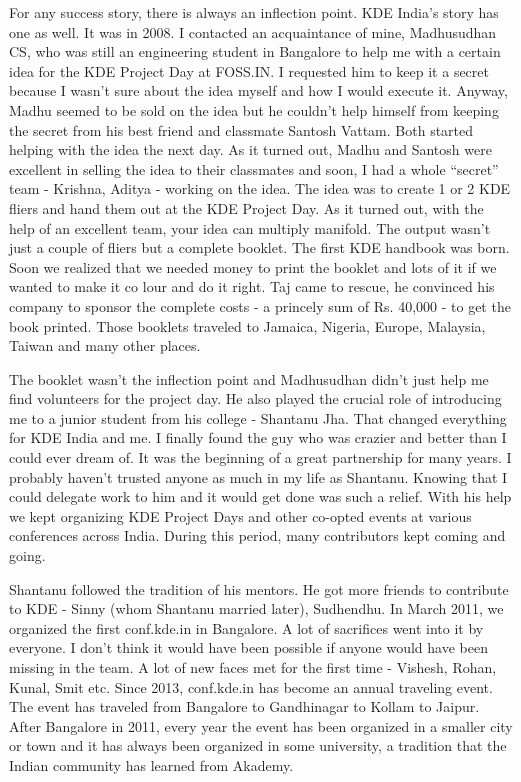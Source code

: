 For any success story, there is always an inflection point. KDE India's story has one as well. It was in 2008. I contacted an acquaintance of mine, Madhusudhan CS, who was still an engineering student in Bangalore to help me with a certain idea for the KDE Project Day at FOSS.IN. I requested him to keep it a secret because I wasn't sure about the idea myself and how I would execute it. Anyway, Madhu seemed to be sold on the idea but he couldn't help himself from keeping the secret from his best friend and classmate Santosh Vattam. Both started helping with the idea the next day. As it turned out, Madhu and Santosh were excellent in selling the idea to their classmates and soon, I had a whole “secret” team - Krishna, Aditya - working on the idea. The idea was to create 1 or 2 KDE fliers and hand them out at the KDE Project Day. As it turned out, with the help of an excellent team, your idea can multiply manifold. The output wasn't just a couple of fliers but a complete booklet. The first KDE handbook was born. Soon we realized that we needed money to print the booklet and lots of it if we wanted to make it co lour and do it right. Taj came to rescue, he convinced his company to sponsor the complete costs - a princely sum of Rs. 40,000 - to get the book printed. Those booklets traveled to Jamaica, Nigeria, Europe, Malaysia, Taiwan and many other places.

The booklet wasn't the inflection point and Madhusudhan didn't just help me find volunteers for the project day. He also played the crucial role of introducing me to a junior student from his college - Shantanu Jha. That changed everything for KDE India and me. I finally found the guy who was crazier and better than I could ever dream of. It was the beginning of a great partnership for many years. I probably haven't trusted anyone as much in my life as Shantanu. Knowing that I could delegate work to him and it would get done was such a relief. With his help we kept organizing KDE Project Days and other co-opted events at various conferences across India. During this period, many contributors kept coming and going.

Shantanu followed the tradition of his mentors. He got more friends to contribute to KDE - Sinny (whom Shantanu married later), Sudhendhu. In March 2011, we organized the first conf.kde.in in Bangalore. A lot of sacrifices went into it by everyone. I don't think it would have been possible if anyone would have been missing in the team. A lot of new faces met for the first time - Vishesh, Rohan, Kunal, Smit etc. Since 2013, conf.kde.in has become an annual traveling event. The event has traveled from Bangalore to Gandhinagar to Kollam to Jaipur. After Bangalore in 2011, every year the event has been organized in a smaller city or town and it has always been organized in some university, a tradition that the Indian community has learned from Akademy.

